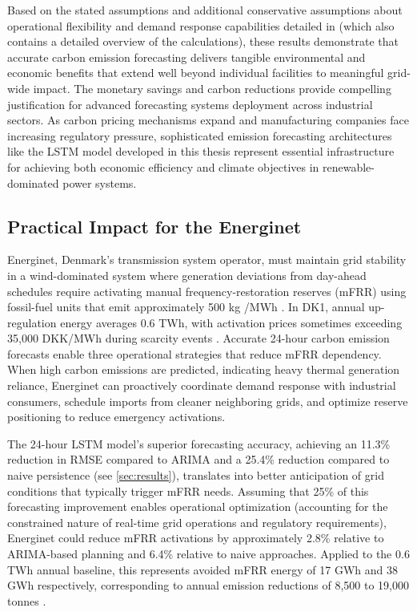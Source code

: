 Based on the stated assumptions and additional conservative assumptions about operational flexibility and demand response capabilities detailed in  (which also contains a detailed overview of the calculations), these results demonstrate that accurate carbon emission forecasting delivers tangible environmental and economic benefits that extend well beyond individual facilities to meaningful grid-wide impact. The monetary savings and carbon reductions provide compelling justification for advanced forecasting systems deployment across industrial sectors. As carbon pricing mechanisms expand and manufacturing companies face increasing regulatory pressure, sophisticated emission forecasting architectures like the LSTM model developed in this thesis represent essential infrastructure for achieving both economic efficiency and climate objectives in renewable-dominated power systems.

\subsection{Practical Impact for the Energinet}
\label{subsec:practical-impact-for-energinet}

Energinet, Denmark's transmission system operator, must maintain grid stability in a wind-dominated system where generation deviations from day-ahead schedules require activating manual frequency-restoration reserves (mFRR) using fossil-fuel units that emit approximately 500 kg \cotwoe{}/MWh \parencite{energidataservice2025}. In DK1, annual up-regulation energy averages 0.6 TWh, with activation prices sometimes exceeding 35,000 DKK/MWh during scarcity events \parencite{energinet2023}.
Accurate 24-hour carbon emission forecasts enable three operational strategies that reduce mFRR dependency. When high carbon emissions are predicted, indicating heavy thermal generation reliance, Energinet can proactively coordinate demand response with industrial consumers, schedule imports from cleaner neighboring grids, and optimize reserve positioning to reduce emergency activations.

The 24-hour LSTM model's superior forecasting accuracy, achieving an 11.3\% reduction in RMSE compared to ARIMA and a 25.4\% reduction compared to naive persistence (see \autoref{sec:results}), translates into better anticipation of grid conditions that typically trigger mFRR needs. Assuming that 25\% of this forecasting improvement enables operational optimization (accounting for the constrained nature of real-time grid operations and regulatory requirements), Energinet could reduce mFRR activations by approximately 2.8\% relative to ARIMA-based planning and 6.4\% relative to naive approaches. Applied to the 0.6 TWh annual baseline, this represents avoided mFRR energy of 17 GWh and 38 GWh respectively, corresponding to annual emission reductions of 8,500 to 19,000 tonnes \cotwoe{}.

